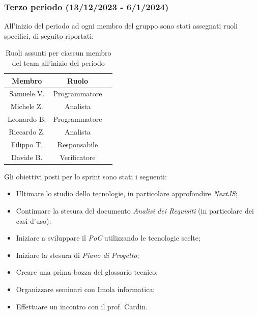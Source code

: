 \subsubsection{Terzo periodo (13/12/2023 - 6/1/2024)}
All'inizio del periodo ad ogni membro del gruppo sono stati assegnati ruoli specifici, di seguito riportati:
\begin{table}[H]
\centering
\begin{tabular}{|c|c|c|}
\hline
\textbf{Membro} & \textbf{Ruolo} \\
\hline
Samuele V. & Programmatore \\
\hline
Michele Z. & Analista \\
\hline
Leonardo B. & Programmatore \\
\hline
Riccardo Z. & Analista \\
\hline
Filippo T. & Responsabile \\
\hline
Davide B. & Verificatore \\
\hline
\end{tabular}
\caption{Ruoli assunti per ciascun membro del team all'inizio del periodo}
\end{table}


Gli obiettivi posti per lo sprint sono stati i seguenti:
\begin{itemize}
    \item Ultimare lo studio dello tecnologie, in particolare approfondire \emph{NextJS};
    \item Continuare la stesura del documento \emph{Analisi dei Requisiti} (in particolare dei casi d'uso);
    \item Iniziare a sviluppare il \emph{PoC} utilizzando le tecnologie scelte;
    \item Iniziare la stesura di \emph{Piano di Progetto};
    \item Creare una prima bozza del glossario tecnico;
    \item Organizzare seminari con Imola informatica;
    \item Effettuare un incontro con il prof. Cardin.
\end{itemize} 

